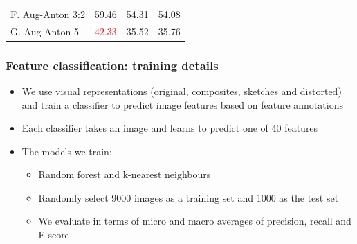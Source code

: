 \documentclass[aspectratio=1610]{beamer} %
\begin{document}
\begin{frame}
\begin{table}[htbp]
{\begin{tabular}{|l|rrr|}
F. Aug-Anton 3:2 & 59.46                                                    & 54.31                                                 & 54.08                                                     \\
G. Aug-Anton 5  & \textcolor{red}{42.33}                                                    & 35.52                                                     & 35.76                                                      \\
\hline
\end{tabular}
}
\label{fig:results}
\end{table}
\end{frame}


\begin{frame}
\frametitle{Feature classification: training details}
\begin{itemize}


	\item We use visual representations (original, composites, sketches and distorted) and train a classifier to predict image features based on feature annotations
	\item Each classifier takes an image and learns to predict one of 40 features
	\pause
	\item The models we train:
		\begin{itemize}
			\item Random forest and k-nearest neighbours
			\item Randomly select 9000 images as a training set and 1000 as the test set
			\item We evaluate in terms of micro and macro averages of precision, recall and F-score
		\end{itemize}

\end{itemize}
\end{frame}


\end{document}
